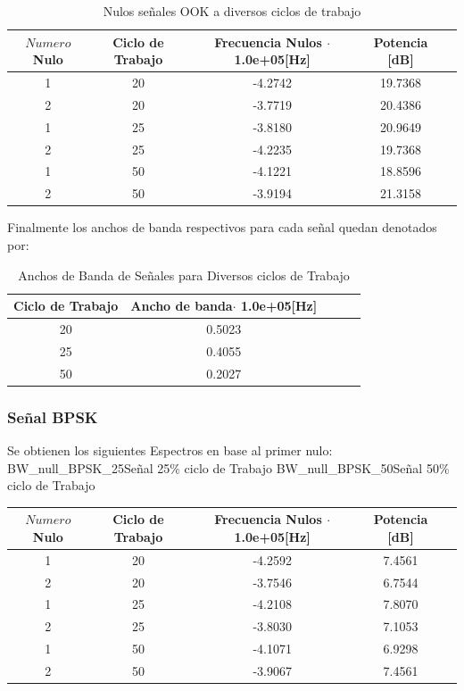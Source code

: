 \documentclass[letterpaper, titlepage]{article}
\begin{document}
\begin{enumerate}
		
		\begin{table}[ht]
			\centering
			\begin{tabular}{c c c c c}
				$Numero$ Nulo & Ciclo de Trabajo & Frecuencia Nulos $\cdot$ 1.0e+05[Hz] & Potencia [dB]\\
				\hline
				1 & 20 & -4.2742 & 19.7368  \\
				2 & 20 & -3.7719 & 20.4386	\\
				1 & 25 & -3.8180 & 20.9649   \\
				2 & 25 & -4.2235 & 19.7368   \\
				1 & 50 & -4.1221 & 18.8596  \\
				2 & 50 & -3.9194 & 21.3158   \\
				
			\end{tabular}
			\caption{Nulos señales OOK a diversos ciclos de trabajo}
			\label{tab:tabla1}
			
		\end{table}
		\begin{center}
		Finalmente los anchos de banda respectivos para cada señal quedan denotados por:
		\end{center}

		\begin{table}[ht]
			\centering
			\begin{tabular}{c c c c c}
				Ciclo de Trabajo & Ancho de banda$\cdot$ 1.0e+05[Hz] \\
				\hline
				20 & 0.5023   \\
				25 & 0.4055	  \\
				50 & 0.2027   \\
			\end{tabular}
			\caption{Anchos de Banda de Señales para Diversos ciclos de Trabajo}
			\label{tab:tabla1}
		\end{table}
		
		\subsubsection{Señal BPSK}
			Se obtienen los siguientes Espectros en base al primer nulo:\\
			 {BW_null_BPSK_25}{\label{fig:sim}}{Señal 25\% ciclo de Trabajo}
			 {BW_null_BPSK_50}{\label{fig:sim}}{Señal 50\% ciclo de Trabajo}\\
			 
			 \begin{table}[ht]
			\centering
			\begin{tabular}{c c c c c}
				$Numero$ Nulo & Ciclo de Trabajo & Frecuencia Nulos $\cdot$ 1.0e+05[Hz] & Potencia [dB]\\
				\hline
				1 & 20 & -4.2592 & 7.4561  \\
				2 & 20 & -3.7546 & 6.7544	\\
				1 & 25 & -4.2108 & 7.8070  \\
				2 & 25 & -3.8030 & 7.1053   \\
				1 & 50 & -4.1071 & 6.9298   \\
				2 & 50 & -3.9067 & 7.4561   \\
				

\end{tabular}
\end{table}
\end{enumerate}
\end{document}
